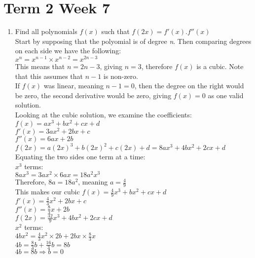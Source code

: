\documentclass[../main.tex]{subfiles}
\begin{document}
\section*{Term 2 Week 7}
\begin{enumerate}[itemsep=1cm]
    \item 
    Find all polynomials \(f(x)\) such that \(f(2x)=f'(x).f''(x)\)\\

    Start by supposing that the polyomial is of degree \textit{n}. Then comparing degrees on each side we have the following:\\
    \(x^n=x^{n-1} \times x^{n-2}=x^{2n-3}\)\\

    This means that \(n=2n-3\), giving \(n=3\), therefore \(f(x)\) is a cubic. Note that this assumes that \(n-1\) is non-zero.\\

    If \(f(x)\) was linear, meaning \(n-1=0\), then the degree on the right would be zero, the second derivative would be zero, giving \(f(x)=0\) as one valid solution.\\

    Looking at the cubic solution, we examine the coefficients:\\
    \(f(x)=ax^3+bx^2+cx+d\)\\

    \(f'(x)=3ax^2+2bx+c\)\\
    \(f''(x)=6ax+2b\)\\
    \(f(2x)=a(2x)^3+b(2x)^2+c(2x)+d=8ax^3+4bx^2+2cx+d\)\\

    Equating the two sides one term at a time:\\
    \(x^3\) terms:\\
    \(8ax^3=3ax^2 \times 6ax=18a^2x^3\)\\
    Therefore, \(8a=18a^2\), meaning \(a=\frac{4}{9}\)\\

    This makes our cubic \(f(x)=\frac{4}{9}x^3+bx^2+cx+d\)\\

    \(f'(x)=\frac{4}{3}x^2+2bx+c\)\\
    \(f''(x)=\frac{8}{3}x+2b\)\\
    \(f(2x)=\frac{32}{9}x^3+4bx^2+2cx+d\)\\

    \(x^2\) terms:\\
    \(4bx^2=\frac{4}{3}x^2 \times 2b + 2bx \times \frac{8}{3}x\)\\
    \(4b=\frac{8}{3}b+\frac{16}{3}b=8b\)\\
    \(4b=8b \Rightarrow b=0\)\\


\end{enumerate}
\end{document}

